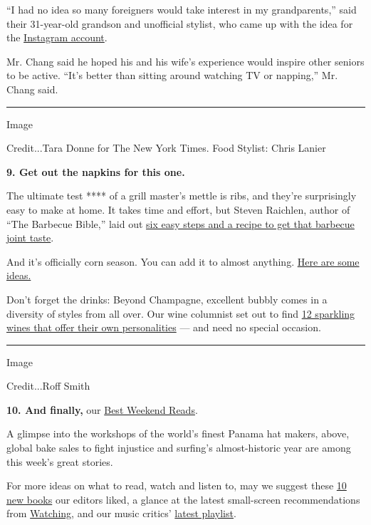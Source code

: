 ``I had no idea so many foreigners would take interest in my
grandparents,'' said their 31-year-old grandson and unofficial stylist,
who came up with the idea for the
\href{https://www.instagram.com/wantshowasyoung/?hl=en}{Instagram
account}.

Mr. Chang said he hoped his and his wife's experience would inspire
other seniors to be active. ``It's better than sitting around watching
TV or napping,'' Mr. Chang said.

\begin{center}\rule{0.5\linewidth}{\linethickness}\end{center}

Image

Credit...Tara Donne for The New York Times. Food Stylist: Chris Lanier

\textbf{9. Get out the napkins for this one.}

The ultimate test **** of a grill master's mettle is ribs, and they're
surprisingly easy to make at home. It takes time and effort, but Steven
Raichlen, author of ``The Barbecue Bible,'' laid out
\href{https://www.nytimes3xbfgragh.onion/2020/07/24/dining/bbq-ribs-recipe.html}{six
easy steps and a recipe to get that barbecue joint taste}.

And it's officially corn season. You can add it to almost anything.
\href{https://www.nytimes3xbfgragh.onion/2020/07/25/at-home/coronavirus-corn-ideas.html}{Here
are some ideas.}

Don't forget the drinks: Beyond Champagne, excellent bubbly comes in a
diversity of styles from all over. Our wine columnist set out to find
\href{https://www.nytimes3xbfgragh.onion/2020/07/23/dining/drinks/best-sparkling-wines.html}{12
sparkling wines that offer their own personalities} --- and need no
special occasion.

\begin{center}\rule{0.5\linewidth}{\linethickness}\end{center}

Image

Credit...Roff Smith

\textbf{10. And finally,} our
\href{https://www.nytimes3xbfgragh.onion/2020/07/24/briefing/best-weekend-reads.html?}{Best
Weekend Reads}.

A glimpse into the workshops of the world's finest Panama hat makers,
above, global bake sales to fight injustice and surfing's
almost-historic year are among this week's great stories.

For more ideas on what to read, watch and listen to, may we suggest
these
\href{https://www.nytimes3xbfgragh.onion/2020/07/23/books/review/10-new-books-we-recommend-this-week.html}{10
new books} our editors liked, a glance at the latest small-screen
recommendations from
\href{https://www.nytimes3xbfgragh.onion/2020/07/23/arts/television/Wynonna-Earp-hannibal-meerkat-manor.html}{Watching},
and our music critics'
\href{https://www.nytimes3xbfgragh.onion/2020/07/24/arts/music/playlist-taylor-swift-j-cole-drake.html}{latest
playlist}.

